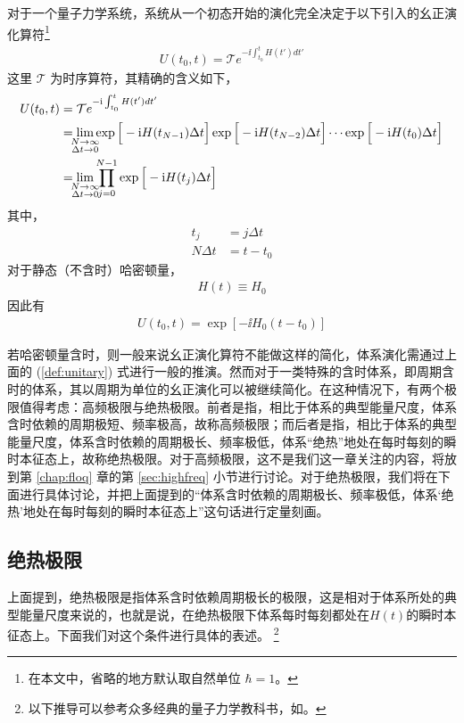 对于一个量子力学系统，系统从一个初态开始的演化完全决定于以下引入的幺正演化算符\footnote{在本文中，省略的地方默认取自然单位 $\hbar=1$。}
\begin{align}
U(t_0,t)=\mathcal{T}e^{-\ii\int_{t_0}^t H(t')dt'}
\end{align}
这里 $\mathcal{T}$ 为时序算符，其精确的含义如下，
\begin{align}\label{def:unitary}
U(t_0, t)&=\mathcal{T}e^{-\ii\int_{t_0}^{t} H(t')dt'} \nonumber\\
&= \lim_{\mathclap{\substack{N\rightarrow\infty\\\Delta t\rightarrow0}}}\exp\Big[-\ii H(t_{N-1})\Delta t\Big]\exp\Big[-\ii H(t_{N-2})\Delta t\Big]\cdots\exp\Big[-\ii H(t_0)\Delta t\Big]\\
&= \lim_{\mathclap{\substack{N\rightarrow\infty\\\Delta t\rightarrow0}}}\prod_{j=0}^{N-1}\exp\Big[-\ii H(t_j)\Delta t\Big]
\end{align}
其中，
\begin{align}
t_{j} &= j\Delta t \\
N\Delta t &= t-t_0
\end{align}
对于静态（不含时）哈密顿量，
\begin{align}
H(t)\equiv H_0
\end{align}
因此有
\begin{align*}
U(t_0,t)=\exp[-\ii H_0(t-t_0)]
\end{align*}

若哈密顿量含时，则一般来说幺正演化算符不能做这样的简化，体系演化需通过上面的 (\ref{def:unitary}) 式进行一般的推演。然而对于一类特殊的含时体系，即周期含时的体系，其以周期为单位的幺正演化可以被继续简化。在这种情况下，有两个极限值得考虑：高频极限与绝热极限。前者是指，相比于体系的典型能量尺度，体系含时依赖的周期极短、频率极高，故称高频极限；而后者是指，相比于体系的典型能量尺度，体系含时依赖的周期极长、频率极低，体系“绝热”地处在每时每刻的瞬时本征态上，故称绝热极限。对于高频极限，这不是我们这一章关注的内容，将放到第 \ref{chap:floq} 章的第 \ref{sec:highfreq} 小节进行讨论。对于绝热极限，我们将在下面进行具体讨论，并把上面提到的“体系含时依赖的周期极长、频率极低，体系‘绝热’地处在每时每刻的瞬时本征态上”这句话进行定量刻画。

\subsection{绝热极限}\label{sec:adiabatic}
上面提到，绝热极限是指体系含时依赖周期极长的极限，这是相对于体系所处的典型能量尺度来说的，也就是说，在绝热极限下体系每时每刻都处在$H(t)$的瞬时本征态上。下面我们对这个条件进行具体的表述。
\footnote{以下推导可以参考众多经典的量子力学教科书，如。}

